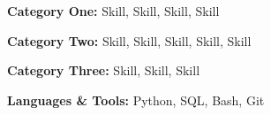 \textbf{Category One:} Skill, Skill, Skill, Skill\par
\textbf{Category Two:} Skill, Skill, Skill, Skill, Skill\par
\textbf{Category Three:} Skill, Skill, Skill\par
\textbf{Languages \& Tools:} Python, SQL, Bash, Git
